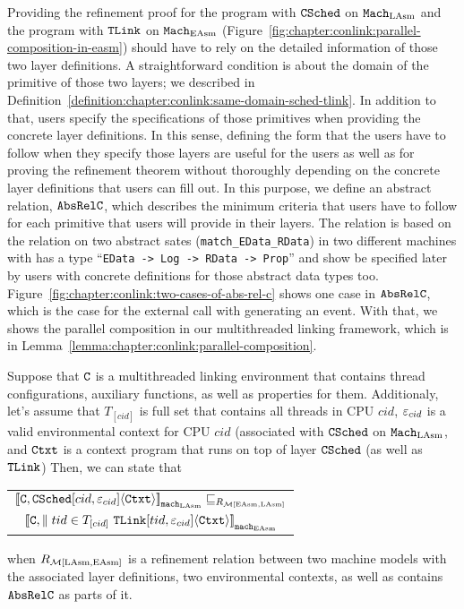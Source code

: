 Providing the refinement proof for the program with ${{\mathrm{\texttt{CSched}}}}$ on ${\mathrm{\texttt{Mach}}}_{\mathrm{LAsm}}$ and the program with ${{\mathrm{\texttt{TLink}}}}$ on ${\mathrm{\texttt{Mach}}}_{\mathrm{EAsm}}$ (Figure~\ref{fig:chapter:conlink:parallel-composition-in-easm})
should have to rely on the detailed information of those two layer definitions.
A straightforward condition is about the domain of the primitive of those two layers; we described in Definition~\ref{definition:chapter:conlink:same-domain-sched-tlink}. 
In addition to that, 
users specify the specifications of those primitives when providing the concrete layer definitions. 
In this sense, defining the form that the users have to follow when they specify those layers
are useful for the users as well as for proving the refinement theorem without thoroughly depending on the concrete layer definitions that users can fill out.  
In this purpose, we define an abstract relation, ${{\mathrm{\texttt{AbsRelC}}}}$,
which describes the minimum criteria that users have to follow for each primitive that users will provide in their layers.
The relation is based on the relation on two abstract sates (\lstinline$match_EData_RData$) in two different machines with has a
type ``\lstinline$EData -> Log -> RData -> Prop$'' and show be specified later by users with  concrete definitions for those abstract data types too. Figure~\ref{fig:chapter:conlink:two-cases-of-abs-rel-c} shows 
one case in  ${{\mathrm{\texttt{AbsRelC}}}}$, which is the case 
for the external call with generating an event. 
With that, we shows the parallel composition in our multithreaded linking framework, which is in Lemma~\ref{lemma:chapter:conlink:parallel-composition}. 

\begin{lemma}
\label{lemma:chapter:conlink:parallel-composition}
Suppose that ${{\mathrm{\texttt{C}}}}$ is a multithreaded linking environment that contains thread configurations, auxiliary functions, as well as properties for them. 
Additionaly, let's assume that  $T_{[cid]}$ is full set that contains all threads in CPU $cid$, 
 ${\varepsilon}_{cid}$ is a valid
environmental context for CPU $cid$ (associated with ${{\mathrm{\texttt{CSched}}}}$ on ${\mathrm{\texttt{Mach}}}_{\mathrm{LAsm}}$,
and ${\mathrm{\texttt{Ctxt}}}$ is a
context program that runs on top of layer ${{\mathrm{\texttt{CSched}}}}$ (as well as ${{\mathrm{\texttt{TLink}}}}$)
 Then, we can state that
 \begin{center}
\begin{tabular}{c}
${[\![{{{\mathrm{\texttt{C}}}}, {{\mathrm{\texttt{CSched}}}}[cid, {\varepsilon}_{cid}]} \langle {{\mathrm{\texttt{Ctxt}}}} \rangle]\!]}_{{\mathrm{\texttt{mach}}}_{\mathrm{LAsm}}} \sqsubseteq_{R_{\mathcal{M}{[\mathrm{EAsm}, \mathrm{LAsm}]}}}$\\ 
${[\![{{{\mathrm{\texttt{C}}}}, \parallel tid \in T_{[cid]} \  {{\mathrm{\texttt{TLink}}}}[tid, {\varepsilon}_{cid}]} \langle {{\mathrm{\texttt{Ctxt}}}} \rangle]\!]}_{{{\mathrm{\texttt{mach}}}_{\mathrm{EAsm}}}}$\\
\end{tabular}
\end{center}
when $R_{\mathcal{M}{[\mathrm{LAsm}, \mathrm{EAsm}]}}$ is a refinement relation between two machine models with the associated layer definitions,
 two environmental contexts,
as well as contains ${{\mathrm{\texttt{AbsRelC}}}}$ as parts of it.
\end{lemma}


